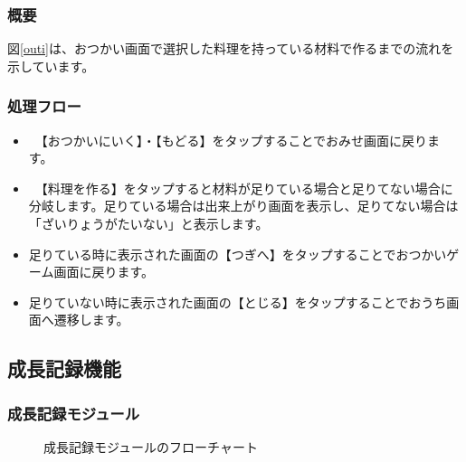 \documentclass[a4j]{jarticle}
\begin{document}
\subsubsection*{概要}
図\ref{outi}は、おつかい画面で選択した料理を持っている材料で作るまでの流れを示しています。

\subsubsection*{処理フロー}
\begin{itemize}
\item　【おつかいにいく】・【もどる】をタップすることでおみせ画面に戻ります。
\item　【料理を作る】をタップすると材料が足りている場合と足りてない場合に分岐します。足りている場合は出来上がり画面を表示し、足りてない場合は「ざいりょうがたいない」と表示します。
\item 足りている時に表示された画面の【つぎへ】をタップすることでおつかいゲーム画面に戻ります。
\item 足りていない時に表示された画面の【とじる】をタップすることでおうち画面へ遷移します。
\end{itemize}


\subsection{成長記録機能}
\subsubsection{成長記録モジュール\label{grow}}
\begin{figure}[H]
    \begin{center}
    \caption {成長記録モジュールのフローチャート}
    \label{growall}
    \end{center}
\end{figure}
\end{document}
